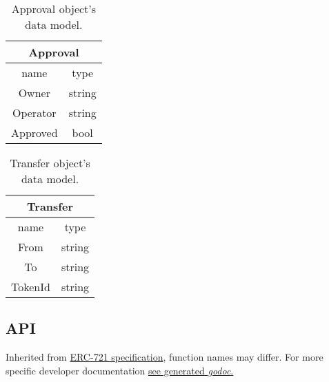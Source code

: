 \begin{center}
  \begin{table}[!ht]
    \centering
    \begin{tabular}{| c | c |}
      \hline
      \multicolumn{2}{|c|}{Approval} \\
      \hline
      name     & type                \\
      \hline
      Owner    & string              \\
      Operator & string              \\
      Approved & bool                \\
      \hline
    \end{tabular}
    \caption{Approval object's data model.}
  \end{table}
\end{center}

\begin{center}
  \begin{table}[!ht]
    \centering
    \begin{tabular}{| c | c |}
      \hline
      \multicolumn{2}{|c|}{Transfer} \\
      \hline
      name    & type                 \\
      \hline
      From    & string               \\
      To      & string               \\
      TokenId & string               \\
      \hline
    \end{tabular}
    \caption{Transfer object's data model.}
  \end{table}
\end{center}

\newpage
\subsection{API}
Inherited from \href{https://eips.ethereum.org/EIPS/eip-721}{ERC-721 specification}, function names may differ. For more specific developer documentation \href{run:spec.pdf}{see generated \emph{godoc}.}
